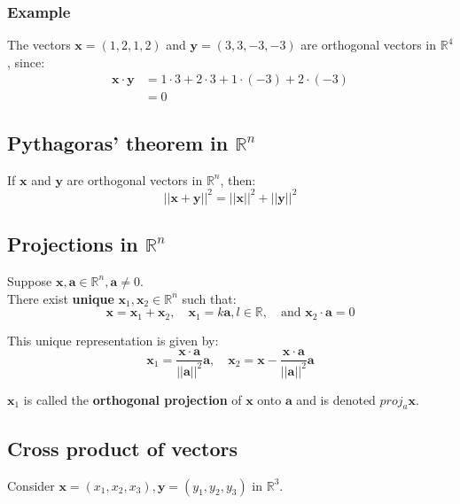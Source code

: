 \documentclass[11pt]{article}
\begin{document}
\subsubsection{Example}
\label{sec:orgfb3ed5b}
The vectors \(\boldsymbol{x} = (1, 2, 1, 2)\) and \(\boldsymbol{y} = (3, 3, -3, -3)\) are orthogonal vectors in \(\mathbb{R}^4\), since:
\begin{align*}
\boldsymbol{x} \cdot \boldsymbol{y} &= 1 \cdot 3 + 2 \cdot 3 + 1 \cdot (-3) + 2 \cdot (-3) \\
&= 0
\end{align*}

\subsection{Pythagoras' theorem in \(\mathbb{R}^n\)}
\label{sec:orgbafdbe2}
If \(\boldsymbol{x}\) and \(\boldsymbol{y}\) are orthogonal vectors in \(\mathbb{R}^n\), then:
\[|| \boldsymbol{x} + \boldsymbol{y} ||^2 = || \boldsymbol{x} ||^2 + || \boldsymbol{y} ||^2\]

\subsection{Projections in \(\mathbb{R}^n\)}
\label{sec:orgeeb4198}
Suppose \(\boldsymbol{x}, \boldsymbol{a} \in \mathbb{R}^n, \boldsymbol{a} \ne 0\).
\\[0pt]

There exist \textbf{unique} \(\boldsymbol{x}_1, \boldsymbol{x}_2 \in \mathbb{R}^n\) such that:
\[\boldsymbol{x} = \boldsymbol{x}_1 + \boldsymbol{x}_2, \quad \boldsymbol{x}_1 = k \boldsymbol{a}, l \in \mathbb{R}, \quad \text{and } \boldsymbol{x}_2 \cdot \boldsymbol{a} = 0\]

This unique representation is given by:
\[\boldsymbol{x}_1 = \frac{\boldsymbol{x} \cdot \boldsymbol{a}}{|| \boldsymbol{a} ||^2} \boldsymbol{a}, \quad \boldsymbol{x}_2 = \boldsymbol{x} - \frac{\boldsymbol{x} \cdot \boldsymbol{a}}{|| \boldsymbol{a} ||^2} \boldsymbol{a}\]

\(\boldsymbol{x}_1\) is called the \textbf{orthogonal projection} of \(\boldsymbol{x}\) onto \(\boldsymbol{a}\) and is denoted \(proj_a \boldsymbol{x}\).

\subsection{Cross product of vectors}
\label{sec:orgb09546d}
Consider \(\boldsymbol{x} = (x_1, x_2, x_3), \boldsymbol{y} = (y_1, y_2, y_3)\) in \(\mathbb{R}^3\).
\\[0pt]
\end{document}
